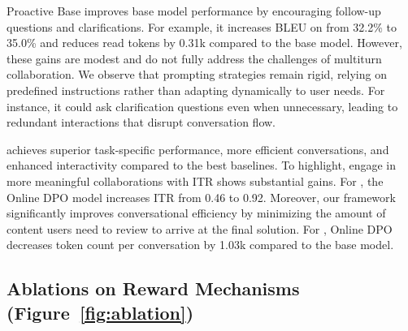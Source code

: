 Proactive Base improves base model performance by encouraging follow-up questions and clarifications. For example, it increases BLEU on \doc from 32.2\% to 35.0\% and reduces read tokens by 0.31k compared to the base model. However, these gains are modest and do not fully address the challenges of multiturn collaboration. We observe that prompting strategies remain rigid, relying on predefined instructions rather than adapting dynamically to user needs. For instance, it could ask clarification questions even when unnecessary, leading to redundant interactions that disrupt conversation flow.

\name{} achieves \taskimprov superior task-specific performance, \efficiencyimprov more efficient conversations, and \itrimprov enhanced interactivity compared to the best baselines.
To highlight, \name{} engage in more meaningful collaborations with ITR shows substantial gains. For \doct, the Online DPO model increases ITR from 0.46 to 0.92. 
Moreover, our framework significantly improves conversational efficiency by minimizing the amount of content users need to review to arrive at the final solution. For \mathct, Online DPO decreases token count per conversation by 1.03k compared to the base model.

\subsection{Ablations on Reward Mechanisms (Figure~\ref{fig:ablation})}
\label{sec:ablation}

